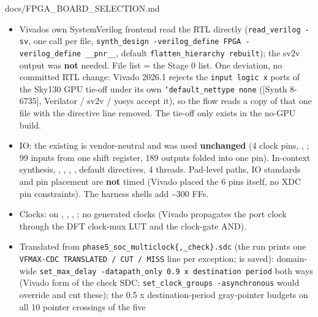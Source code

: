 \begin{relocated}{docs/FPGA_BOARD_SELECTION.md}
\begin{itemize}
\tightlist
\item
  Vivado\textquotesingle s own SystemVerilog frontend read the RTL
  directly (\texttt{read\_\allowbreak{}verilog\ -\allowbreak{}sv}, one
  call per file,
  \texttt{synth\_\allowbreak{}design\ -\allowbreak{}verilog\_\allowbreak{}define\ FPGA\ -\allowbreak{}verilog\_\allowbreak{}define\ \_\allowbreak{}\_\allowbreak{}pnr\_\allowbreak{}\_\allowbreak{}},
  default \texttt{flatten\_\allowbreak{}hierarchy\ rebuilt}); the sv2v
  output was \textbf{not} needed. File list = the Stage 0 list. One
  deviation, no committed RTL change: Vivado 2026.1 rejects the
  \texttt{input\ logic\ x} ports of the Sky130 GPU tie-off
   under its own
  \texttt{`default\_\allowbreak{}nettype\ none} ({[}Synth 8-6735{]},
  Verilator / sv2v / yosys accept it), so the flow reads a copy of that
  one file with the directive line removed. The tie-off only exists in
  the no-GPU build.
\item
  IO: the existing  is
  vendor-neutral and was used \textbf{unchanged} (4 clock pins,
  , ; 99 inputs from one shift register, 189
  outputs folded into one pin). In-context synthesis, ,
  , , ,
  default directives, 4 threads. Pad-level paths, IO standards and pin
  placement are \textbf{not} timed (Vivado placed the 6 pins itself, no
  XDC pin constraints). The harness shells add \textasciitilde300 FFs.
\item
  Clocks:  on , ,
  , ; no generated clocks (Vivado
  propagates the port clock through the DFT clock-mux LUT and the
  clock-gate AND).
\item
  Translated from
  \texttt{phase5\_\allowbreak{}soc\_\allowbreak{}multiclock\{,\allowbreak{}\_\allowbreak{}check\}.\allowbreak{}sdc}
  (the run prints one
  \texttt{VFMAX-\allowbreak{}CDC\ TRANSLATED\ /\allowbreak{}\ CUT\ /\allowbreak{}\ MISS}
  line per exception;  is saved): domain-wide
  \texttt{set\_\allowbreak{}max\_\allowbreak{}delay\ -\allowbreak{}datapath\_\allowbreak{}only\ 0.\allowbreak{}9\ x\ destination\ period}
  both ways (Vivado form of the check SDC;
  \texttt{set\_\allowbreak{}clock\_\allowbreak{}groups\ -\allowbreak{}asynchronous}
  would override and cut these); the 0.5 x destination-period
  gray-pointer budgets on all 10 pointer crossings of the five

\end{itemize}
\end{relocated}
